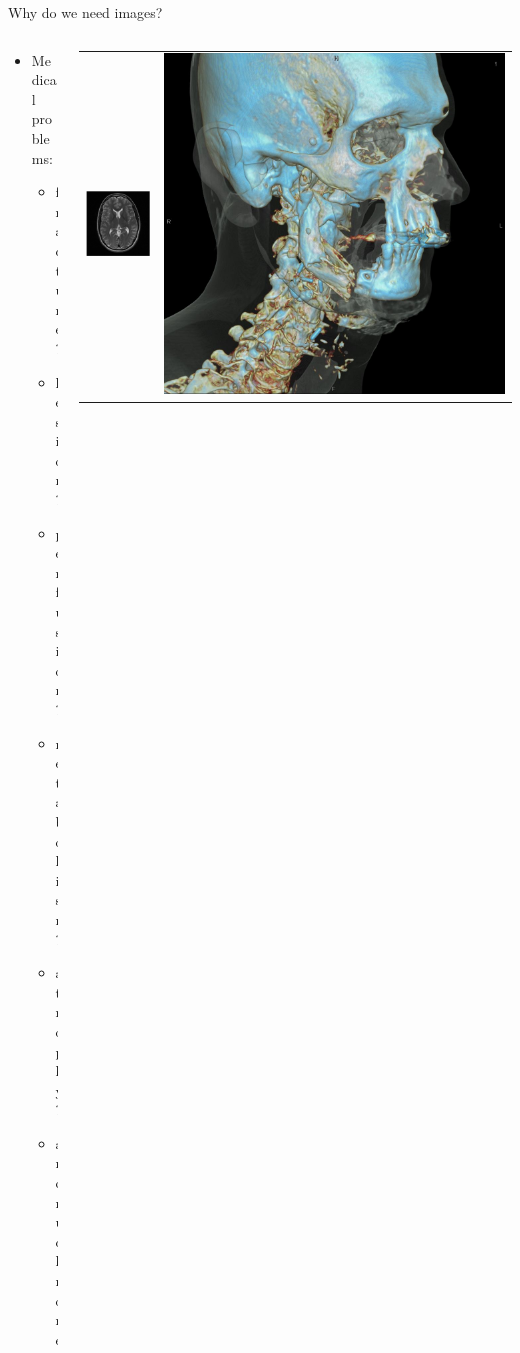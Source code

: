 
\begin{frame}[c]{Why do we need images?}

	\begin{columns}[c]
		\begin{column}{0.4\textwidth}

			\begin{itemize}
				\item Medical problems:
				      \begin{itemize}
					      \item fracture?
					      \item lesion?
					      \item perfusion?
					      \item metabolism?
					      \item atrophy?
					      \item and much more
				      \end{itemize}
			\end{itemize}
		\end{column}\begin{column}{0.5\textwidth}
			\begin{tabular}{cc}
				\includegraphics[width=.45\textwidth]{images/mri_brain_t2.png}                                                               & \includegraphics[width=.45\textwidth]{images/155_13.jpg} \\

\end{tabular}
\end{column}
\end{columns}
\end{frame}
